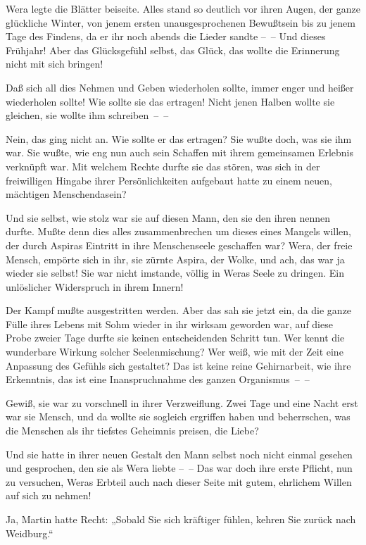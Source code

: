 Wera legte die Blätter beiseite. Alles stand so deutlich vor ihren
Augen, der ganze glückliche Winter, von jenem ersten
unausgesprochenen Bewußtsein bis zu jenem Tage des Findens, da er
ihr noch abends die Lieder sandte –~– Und dieses Frühjahr! Aber das
Glücksgefühl selbst, das Glück, das wollte die Erinnerung nicht mit
sich bringen!

Daß sich all dies Nehmen und Geben wiederholen sollte, immer enger
und heißer wiederholen sollte! Wie sollte sie das ertragen! Nicht
jenen Halben wollte sie gleichen, sie wollte ihm schreiben~–~–

Nein, das ging nicht an. Wie sollte er das ertragen? Sie wußte
doch, was sie ihm war. Sie wußte, wie eng nun auch sein Schaffen
mit ihrem gemeinsamen Erlebnis verknüpft war. Mit welchem Rechte
durfte sie das stören, was sich in der freiwilligen Hingabe ihrer
Persönlichkeiten aufgebaut hatte zu einem neuen, mächtigen
Menschendasein?

Und sie selbst, wie stolz war sie auf diesen Mann, den sie den
ihren nennen durfte. Mußte denn dies alles zusammenbrechen um
dieses eines Mangels willen, der durch Aspiras Eintritt in ihre
Menschenseele geschaffen war? Wera, der freie Mensch, empörte sich
in ihr, sie zürnte Aspira, der Wolke, und ach, das war ja wieder
sie selbst! Sie war nicht imstande, völlig in Weras Seele zu
dringen. Ein unlöslicher Widerspruch in ihrem Innern!

Der Kampf mußte ausgestritten werden. Aber das sah sie jetzt ein,
da die ganze Fülle ihres Lebens mit Sohm wieder in ihr wirksam
geworden war, auf diese Probe zweier Tage durfte sie keinen
entscheidenden Schritt tun. Wer kennt die wunderbare Wirkung
solcher Seelenmischung? Wer weiß, wie mit der Zeit eine Anpassung
des Gefühls sich gestaltet? Das ist keine reine Gehirnarbeit, wie
ihre Erkenntnis, das ist eine Inanspruchnahme des ganzen
Organismus~–~–

Gewiß, sie war zu vorschnell in ihrer Verzweiflung. Zwei Tage und
eine Nacht erst war sie Mensch, und da wollte sie sogleich
ergriffen haben und beherrschen, was die Menschen als ihr tiefstes
Geheimnis preisen, die Liebe?

Und sie hatte in ihrer neuen Gestalt den Mann selbst noch nicht
einmal gesehen und gesprochen, den sie als Wera liebte –~– Das war
doch ihre erste Pflicht, nun zu versuchen, Weras Erbteil auch nach
dieser Seite mit gutem, ehrlichem Willen auf sich zu nehmen!

Ja, Martin hatte Recht: „Sobald Sie sich kräftiger fühlen, kehren
Sie zurück nach Weidburg.“

